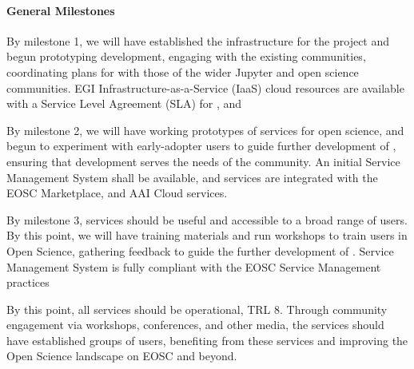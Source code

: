 


\paragraph{General Milestones}

\begin{milestones}
  {
  By milestone 1, we will have established the infrastructure
  for the project and begun prototyping development,
  engaging with the existing communities,
  coordinating plans for \TheProject with those of the wider Jupyter and open science communities.
  EGI Infrastructure-as-a-Service (IaaS) cloud resources are available with a
  Service Level Agreement (SLA) for \TheProject,
  and
  }

  {
  By milestone 2, we will have working prototypes of services
  for open science, and begun to experiment with early-adopter
  users to guide further development of \TheProject,
  ensuring that development serves the needs of the community.
  An initial \TheProject Service Management System shall be available,
  and \TheProject services are integrated with the EOSC Marketplace,
  and AAI Cloud services.
  }

  {
  By milestone 3, services should be useful and accessible
  to a broad range of users.
  By this point, we will have training materials and run
  workshops to train users in Open Science,
  gathering feedback to guide the further development of \TheProject.
  \TheProject Service Management System is fully compliant with the EOSC Service Management practices
  }


  {
  By this point, all \TheProject services should be operational, TRL 8.
  Through community engagement via workshops, conferences, and other media,
  the services should have established groups of users,
  benefiting from these services and improving the Open Science landscape
  on EOSC and beyond.
  }

\end{milestones}
